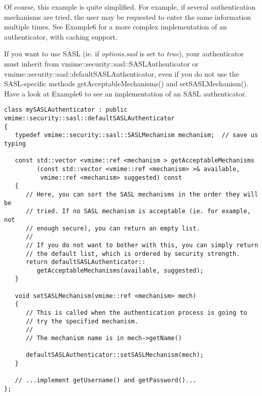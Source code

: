 
Of course, this example is quite simplified. For example, if several
authentication mechanisms are tried, the user may be requested to enter the
same information multiple times. See  {\vexample Example6} for a more complex
implementation of an authenticator, with caching support.

If you want to use SASL (ie. if \emph{options.sasl} is set to \emph{true}),
your authenticator must inherit from
{\vcode vmime::security::sasl::SASLAuthenticator} or
{\vcode vmime::security::sasl::defaultSASLAuthenticator}, even if you do not
use the SASL-specific methods {\vcode getAcceptableMechanisms()} and
{\vcode setSASLMechanism()}. Have a look at {\vexample Example6} to see an
implementation of an SASL authenticator.

\begin{lstlisting}[caption={A simple SASL authenticator}]
class mySASLAuthenticator : public vmime::security::sasl::defaultSASLAuthenticator
{
   typedef vmime::security::sasl::SASLMechanism mechanism;  // save us typing

   const std::vector <vmime::ref <mechanism > getAcceptableMechanisms
         (const std::vector <vmime::ref <mechanism> >& available,
          vmime::ref <mechanism> suggested) const
   {
      // Here, you can sort the SASL mechanisms in the order they will be
      // tried. If no SASL mechanism is acceptable (ie. for example, not
      // enough secure), you can return an empty list.
      //
      // If you do not want to bother with this, you can simply return
      // the default list, which is ordered by security strength.
      return defaultSASLAuthenticator::
         getAcceptableMechanisms(available, suggested);
   }

   void setSASLMechanism(vmime::ref <mechanism> mech)
   {
      // This is called when the authentication process is going to
      // try the specified mechanism.
      //
      // The mechanism name is in mech->getName()

      defaultSASLAuthenticator::setSASLMechanism(mech);
   }

   // ...implement getUsername() and getPassword()...
};
\end{lstlisting}


